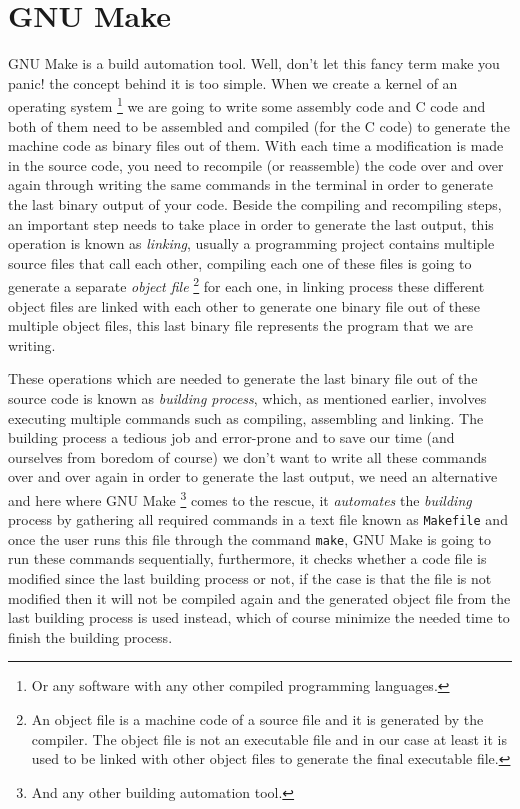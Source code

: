 \section{GNU Make}\label{gnu-make}

GNU Make is a build automation tool. Well, don't let this fancy term
make you panic! the concept behind it is too simple. When we create a
kernel of an operating system \footnote{Or any software with any other
  compiled programming languages.} we are going to write some assembly
code and C code and both of them need to be assembled and compiled (for
the C code) to generate the machine code as binary files out of them.
With each time a modification is made in the source code, you need to
recompile (or reassemble) the code over and over again through writing
the same commands in the terminal in order to generate the last binary
output of your code. Beside the compiling and recompiling steps, an
important step needs to take place in order to generate the last output,
this operation is known as \emph{linking}, usually a programming project
contains multiple source files that call each other, compiling each one
of these files is going to generate a separate \emph{object file}
\footnote{An object file is a machine code of a source file and it is
  generated by the compiler. The object file is not an executable file
  and in our case at least it is used to be linked with other object
  files to generate the final executable file.} for each one, in linking
process these different object files are linked with each other to
generate one binary file out of these multiple object files, this last
binary file represents the program that we are writing.

These operations which are needed to generate the last binary file out
of the source code is known as \emph{building process}, which, as
mentioned earlier, involves executing multiple commands such as
compiling, assembling and linking. The building process a tedious job
and error-prone and to save our time (and ourselves from boredom of
course) we don't want to write all these commands over and over again in
order to generate the last output, we need an alternative and here where
GNU Make \footnote{And any other building automation tool.} comes to the
rescue, it \emph{automates} the \emph{building} process by gathering all
required commands in a text file known as \lstinline!Makefile! and once
the user runs this file through the command \lstinline!make!, GNU Make
is going to run these commands sequentially, furthermore, it checks
whether a code file is modified since the last building process or not,
if the case is that the file is not modified then it will not be
compiled again and the generated object file from the last building
process is used instead, which of course minimize the needed time to
finish the building process.

